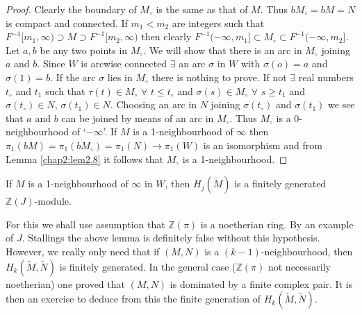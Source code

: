 \begin{proof}
Clearly the boundary of $M_\circ$ is the same as that of $M$. Thus $bM_\circ =
bM = N$ is compact and connected. If $m_1 < m_2$ are integers such
that $F^{-1} [m_1,\infty) \supset M \supset F^{-1} [m_2, \infty)$ then
    clearly $F^{-1} (-\infty, m_1] \subset M_\circ \subset F^{-1}
  (-\infty, m_2]$. Let $a, b$ be any two points in $M_\circ$. We will show
that there is an 
    arc in $M_\circ$ joining $a$ and $b$. Since $W$ is arcwise connected
    $\exists$ an arc $\sigma$ in $W$ with $\sigma (o) = a$ and $\sigma (1)
    = b$. If the arc $\sigma$ lies in $M_\circ$ there is nothing to
    prove. If not $\exists$ real numbers $t_\circ$ and $t_1$ such that
    $\tau(t) \in M_\circ$ $\forall$ $t \leq t_\circ$ and $\sigma (s) \in
    M_\circ$ $\forall$ $s \geq t_1$ and $\sigma (t_\circ) \in N$, $\sigma
    (t_1) \in N$. Choosing an arc in $N$ joining $\sigma (t_\circ)$
    and $\sigma (t_1)$ we see that $a$ and $b$ can be joined by means
    of an arc in $M_\circ$. Thus $M_\circ$ is a 0-neighbourhood of\pageoriginale
    `$-\infty$'. If $M$ is a 1-neighbourhood of $\infty$ then $\pi_1
    (bM) = \pi_1 (bM_\circ) = \pi_1 (N) \to \pi_1 (W)$ is an isomorphism
    and from Lemma \ref{chap2:lem2.8} it follows that $M_\circ$ is a 1-neighbourhood. 
\end{proof}

\begin{lemma}\label{chap2:lem3.4}%
If $M$ is a 1-neighbourhood of $\infty$ in $W$, then $H_j (\tilde{M})$
is a finitely generated $\mathbb{Z} (J)$-module. 

For this we shall use assumption that $\mathbb{Z} (\pi)$ is a
noetherian ring. By an example of $J$.  Stallings the above lemma is
definitely false without this hypothesis. However, we really only need
that if $(M, N)$ is a $(k-1)$-neighbourhood, then $H_k (\tilde{M},
\tilde{N})$ is finitely generated. In the general case
($\mathbb{Z}(\pi)$ not necessarily noetherian) one proved that $(M, N)$
is dominated by a finite complex pair. It is then an exercise to
deduce from this the finite generation of $H_k (\tilde{M},
\tilde{N})$.	 
\end{lemma}

